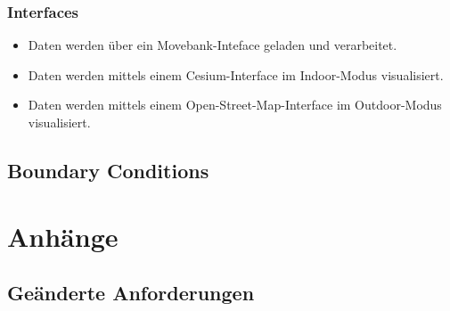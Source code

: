\documentclass[12pt]{article} %
\begin{document}


\subsubsection{Interfaces}
\label{sec:interfaces}
\begin{itemize}
	\item Daten werden über ein Movebank-Inteface geladen und verarbeitet. 
	\item Daten werden mittels einem Cesium-Interface im Indoor-Modus visualisiert.
	\item Daten werden mittels einem Open-Street-Map-Interface im Outdoor-Modus visualisiert.

\end{itemize}

\subsection{Boundary Conditions}
{\color{red}{Oliver}}




\section{Anhänge}

\subsection{Geänderte Anforderungen}


\end{document}
